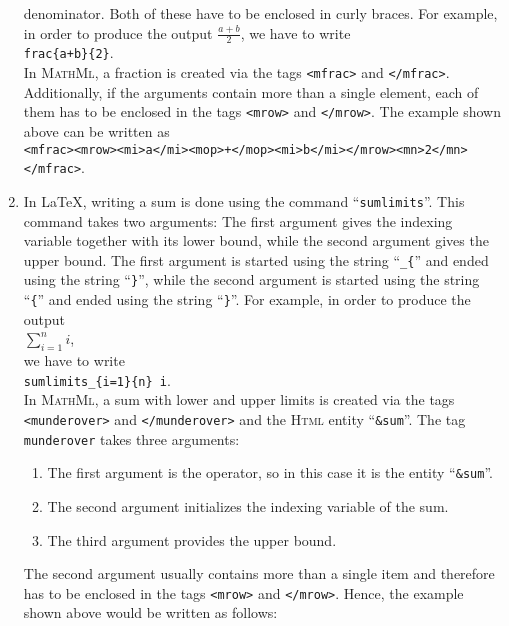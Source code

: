 \begin{enumerate}
      denominator.  Both of these have to be enclosed in curly braces.
      For example, in order to produce the output $\frac{a+b}{2}$, we have to write
      \\[0.2cm]
      \hspace*{1.3cm}
      \texttt{frac\{a+b\}\{2\}}.
      \\[0.2cm]
      In \textsc{MathMl}, a fraction is created via the tags \texttt{<mfrac>} 
      and \texttt{</mfrac>}.  Additionally, if the arguments contain more than a single element,
      each of them has to be enclosed in the tags \texttt{<mrow>} and \texttt{</mrow>}.
      The example shown above can be written as
      \\[0.2cm]
      \hspace*{1.3cm}
      \texttt{<mfrac><mrow><mi>a</mi><mop>+</mop><mi>b</mi></mrow><mn>2</mn></mfrac>}.
\item In \LaTeX, writing a sum is done using the command
      ``\texttt{sumlimits}''.  
      This command takes two arguments:  The first argument gives the indexing variable together
      with its lower bound, while the second argument gives the upper bound.  The first argument
      is started using the string ``\texttt{\_\{}'' and ended using the string ``\texttt{\}}'',
      while the second argument is started using the string ``\texttt{\{}'' and ended using the
      string ``\texttt{\}}''.  For example, in order to produce the output 
      \\[0.2cm]
      \hspace*{1.3cm}
      $\displaystyle\sum\limits_{i=1}^{n} i$,
      \\[0.2cm]
      we have to write
      \\[0.2cm]
      \hspace*{1.3cm}
      \texttt{sumlimits\_\{i=1\}\{n\} i}.
      \\[0.2cm]
      In \textsc{MathMl}, a sum with lower and upper limits is created via the tags
      \texttt{<munderover>} and \texttt{</munderover>} and the \textsc{Html} entity ``\texttt{\&sum}''.
      The tag \texttt{munderover} takes three arguments:
      \begin{enumerate}
      \item The first argument is the operator, so in this case it is the entity ``\texttt{\&sum}''.
      \item The second argument initializes the indexing variable of the sum.
      \item The third argument provides the upper bound.
      \end{enumerate}
      The second argument usually contains more than a single item and therefore has to be enclosed 
      in the tags \texttt{<mrow>} and \texttt{</mrow>}.
      Hence, the example shown above would be written as follows:
      \pagebreak
      

\end{enumerate}
